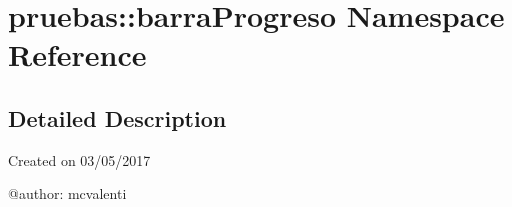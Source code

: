 \section{pruebas\-:\-:barra\-Progreso \-Namespace \-Reference}
\label{namespacepruebas_1_1barra_progreso}


\subsection{\-Detailed \-Description}
\begin{DoxyVerb}
Created on 03/05/2017

@author: mcvalenti
\end{DoxyVerb}
 